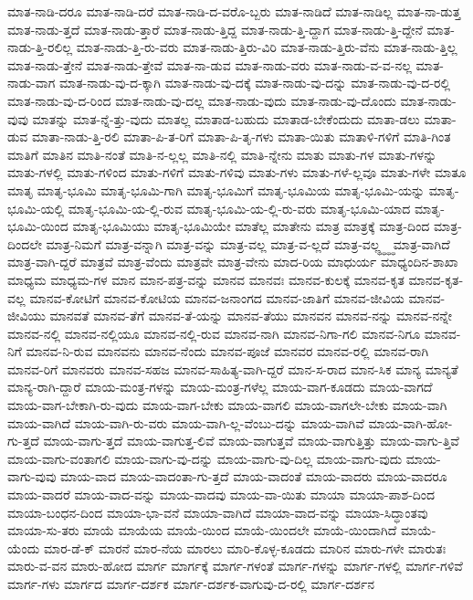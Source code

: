 {ಮಾತ-ನಾಡಿ-ದರೂ
ಮಾತ-ನಾಡಿ-ದರೆ
ಮಾತ-ನಾಡಿ-ದ-ವರೊ-ಬ್ಬರು
ಮಾತ-ನಾಡಿದೆ
ಮಾತ-ನಾಡಿಲ್ಲ
ಮಾತ-ನಾ-ಡುತ್ತ
ಮಾತ-ನಾಡು-ತ್ತದೆ
ಮಾತ-ನಾಡು-ತ್ತಾರೆ
ಮಾತ-ನಾಡು-ತ್ತಿದ್ದ
ಮಾತ-ನಾಡು-ತ್ತಿ-ದ್ದಾಗ
ಮಾತ-ನಾಡು-ತ್ತಿ-ದ್ದೇನೆ
ಮಾತ-ನಾಡು-ತ್ತಿ-ರಲಿಲ್ಲ
ಮಾತ-ನಾಡು-ತ್ತಿ-ರು-ವರು
ಮಾತ-ನಾಡು-ತ್ತಿರು-ವಿರಿ
ಮಾತ-ನಾಡು-ತ್ತಿರು-ವೆನು
ಮಾತ-ನಾಡು-ತ್ತಿಲ್ಲ
ಮಾತ-ನಾಡು-ತ್ತೇನೆ
ಮಾತ-ನಾಡು-ತ್ತೇವೆ
ಮಾತ-ನಾ-ಡುವ
ಮಾತ-ನಾಡು-ವರು
ಮಾತ-ನಾಡು-ವ-ವ-ನಲ್ಲ
ಮಾತ-ನಾಡು-ವಾಗ
ಮಾತ-ನಾಡು-ವು-ದ-ಕ್ಕಾಗಿ
ಮಾತ-ನಾಡು-ವು-ದಕ್ಕೆ
ಮಾತ-ನಾಡು-ವು-ದನ್ನು
ಮಾತ-ನಾಡು-ವು-ದ-ರಲ್ಲಿ
ಮಾತ-ನಾಡು-ವು-ದ-ರಿಂದ
ಮಾತ-ನಾಡು-ವು-ದಲ್ಲ
ಮಾತ-ನಾಡು-ವುದು
ಮಾತ-ನಾಡು-ವು-ದೊಂದು
ಮಾತ-ನಾಡು-ವುವು
ಮಾತನ್ನು
ಮಾತ-ನ್ನೆ-ತ್ತು-ವುದು
ಮಾತಲ್ಲ
ಮಾತಾಡ-ಬಹುದು
ಮಾತಾಡ-ಬೇಕೆಂದುದು
ಮಾತಾ-ಡಲು
ಮಾತಾ-ಡುವ
ಮಾತಾ-ನಾಡು-ತ್ತಿ-ರಲಿ
ಮಾತಾ-ಪಿ-ತ-ರಿಗೆ
ಮಾತಾ-ಪಿ-ತೃ-ಗಳು
ಮಾತಾ-ಯಿತು
ಮಾತಾಳಿ-ಗಳಿಗೆ
ಮಾತಿ-ಗಿಂತ
ಮಾತಿಗೆ
ಮಾತಿನ
ಮಾತಿ-ನಂತೆ
ಮಾತಿ-ನ-ಲ್ಲಲ್ಲ
ಮಾತಿ-ನಲ್ಲಿ
ಮಾತಿ-ನ್ನೇನು
ಮಾತು
ಮಾತು-ಗಳ
ಮಾತು-ಗಳನ್ನು
ಮಾತು-ಗಳಲ್ಲಿ
ಮಾತು-ಗಳಿಂದ
ಮಾತು-ಗಳಿಗೆ
ಮಾತು-ಗಳಿವು
ಮಾತು-ಗಳು
ಮಾತು-ಗಳೆ-ಲ್ಲವೂ
ಮಾತು-ಗಳೇ
ಮಾತೂ
ಮಾತೃ
ಮಾತೃ-ಭೂಮಿ
ಮಾತೃ-ಭೂಮಿ-ಗಾಗಿ
ಮಾತೃ-ಭೂಮಿಗೆ
ಮಾತೃ-ಭೂಮಿಯ
ಮಾತೃ-ಭೂಮಿ-ಯನ್ನು
ಮಾತೃ-ಭೂಮಿ-ಯಲ್ಲಿ
ಮಾತೃ-ಭೂಮಿ-ಯ-ಲ್ಲಿ-ರುವ
ಮಾತೃ-ಭೂಮಿ-ಯ-ಲ್ಲಿ-ರು-ವರು
ಮಾತೃ-ಭೂಮಿ-ಯಾದ
ಮಾತೃ-ಭೂಮಿ-ಯಿಂದ
ಮಾತೃ-ಭೂಮಿಯು
ಮಾತೃ-ಭೂಮಿಯೇ
ಮಾತೆಲ್ಲ
ಮಾತೇನು
ಮಾತ್ರ
ಮಾತ್ರಕ್ಕೆ
ಮಾತ್ರ-ದಿಂದ
ಮಾತ್ರ-ದಿಂದಲೇ
ಮಾತ್ರ-ನಿಮಗೆ
ಮಾತ್ರ-ವನ್ನಾಗಿ
ಮಾತ್ರ-ವನ್ನು
ಮಾತ್ರ-ವಲ್ಲ
ಮಾತ್ರ-ವ-ಲ್ಲದೆ
ಮಾತ್ರ-ವಲ್ಲ್ಧ್ಧ್ಧ್ಧ
ಮಾತ್ರ-ವಾಗಿದೆ
ಮಾತ್ರ-ವಾಗಿ-ದ್ದರೆ
ಮಾತ್ರವೆ
ಮಾತ್ರ-ವೆಂದು
ಮಾತ್ರವೇ
ಮಾತ್ರ-ವೇನು
ಮಾದ-ರಿಯ
ಮಾಧುರ್ಯ
ಮಾಧ್ಯಂದಿನ-ಶಾಖಾ
ಮಾಧ್ಯಮ
ಮಾಧ್ಯಮ-ಗಳ
ಮಾನ
ಮಾನ-ಪತ್ರ-ವನ್ನು
ಮಾನವ
ಮಾನವಃ
ಮಾನವ-ಕುಲಕ್ಕೆ
ಮಾನವ-ಕೃತ
ಮಾನವ-ಕೃತ-ವಲ್ಲ
ಮಾನವ-ಕೋಟಿಗೆ
ಮಾನವ-ಕೋಟಿಯ
ಮಾನವ-ಜನಾಂಗದ
ಮಾನವ-ಜಾತಿಗೆ
ಮಾನವ-ಜೀವಿಯ
ಮಾನವ-ಜೀವಿಯು
ಮಾನವತೆ
ಮಾನವ-ತೆಗೆ
ಮಾನವ-ತೆ-ಯನ್ನು
ಮಾನವ-ತೆಯು
ಮಾನವನ
ಮಾನವ-ನನ್ನು
ಮಾನವ-ನನ್ನೇ
ಮಾನವ-ನಲ್ಲಿ
ಮಾನವ-ನಲ್ಲಿಯೂ
ಮಾನವ-ನಲ್ಲಿ-ರುವ
ಮಾನವ-ನಾಗಿ
ಮಾನವ-ನಿಗಾ-ಗಲಿ
ಮಾನವ-ನಿಗೂ
ಮಾನವ-ನಿಗೆ
ಮಾನವ-ನಿ-ರುವ
ಮಾನವನು
ಮಾನವ-ನೆಂದು
ಮಾನವ-ಪೂಜೆ
ಮಾನವರ
ಮಾನವ-ರಲ್ಲಿ
ಮಾನವ-ರಾಗಿ
ಮಾನವ-ರಿಗೆ
ಮಾನವರು
ಮಾನವ-ಸಹಜ
ಮಾನವ-ಸಾಹಿತ್ಯ-ವಾಗಿ-ದ್ದರೆ
ಮಾನ-ಸ-ರಾದ
ಮಾನ-ಸಿಕ
ಮಾನ್ಯ
ಮಾನ್ಯತೆ
ಮಾನ್ಯ-ರಾಗಿ-ದ್ದಾರೆ
ಮಾಯ-ಮಂತ್ರ-ಗಳನ್ನು
ಮಾಯ-ಮಂತ್ರ-ಗಳೆಲ್ಲ
ಮಾಯ-ವಾಗ-ಕೂಡದು
ಮಾಯ-ವಾಗದೆ
ಮಾಯ-ವಾಗ-ಬೇಕಾಗಿ-ರು-ವುದು
ಮಾಯ-ವಾಗ-ಬೇಕು
ಮಾಯ-ವಾಗಲಿ
ಮಾಯ-ವಾಗಲೇ-ಬೇಕು
ಮಾಯ-ವಾಗಿ
ಮಾಯ-ವಾಗಿದೆ
ಮಾಯ-ವಾಗಿ-ರು-ವರು
ಮಾಯ-ವಾಗಿ-ಲ್ಲ-ವೆಂಬು-ದನ್ನು
ಮಾಯ-ವಾಗಿವೆ
ಮಾಯ-ವಾಗಿ-ಹೋ-ಗು-ತ್ತದೆ
ಮಾಯ-ವಾಗು-ತ್ತದೆ
ಮಾಯ-ವಾಗುತ್ತ-ಲಿವೆ
ಮಾಯ-ವಾಗುತ್ತವೆ
ಮಾಯ-ವಾಗುತ್ತಿತ್ತು
ಮಾಯ-ವಾಗು-ತ್ತಿವೆ
ಮಾಯ-ವಾಗು-ವಂತಾಗಲಿ
ಮಾಯ-ವಾಗು-ವು-ದನ್ನು
ಮಾಯ-ವಾಗು-ವು-ದಿಲ್ಲ
ಮಾಯ-ವಾಗು-ವುದು
ಮಾಯ-ವಾಗು-ವುವು
ಮಾಯ-ವಾದ
ಮಾಯ-ವಾದಂತಾ-ಗು-ತ್ತದೆ
ಮಾಯ-ವಾದಂತೆ
ಮಾಯ-ವಾದರು
ಮಾಯ-ವಾದರೂ
ಮಾಯ-ವಾದರೆ
ಮಾಯ-ವಾದ-ವನ್ನು
ಮಾಯ-ವಾದವು
ಮಾಯ-ವಾ-ಯಿತು
ಮಾಯಾ
ಮಾಯಾ-ಪಾಶ-ದಿಂದ
ಮಾಯಾ-ಬಂಧನ-ದಿಂದ
ಮಾಯಾ-ಭಾ-ವನೆ
ಮಾಯಾ-ವಾಗಿದೆ
ಮಾಯಾ-ವಾದ-ವನ್ನು
ಮಾಯಾ-ಸಿದ್ಧಾಂತವು
ಮಾಯಾ-ಸು-ತರು
ಮಾಯೆ
ಮಾಯೆಯ
ಮಾಯೆ-ಯಿಂದ
ಮಾಯೆ-ಯಿಂದಲೇ
ಮಾಯೆ-ಯಿಂದಾಗಿದೆ
ಮಾಯೆ-ಯೆಂದು
ಮಾರ-ಡೆ-ಕ್
ಮಾರನೆ
ಮಾರ-ನೆಯ
ಮಾರಲು
ಮಾರಿ-ಕೊಳ್ಳ-ಕೂಡದು
ಮಾರಿನ
ಮಾರು-ಗಳೇ
ಮಾರುತಃ
ಮಾರು-ವ-ವನ
ಮಾರು-ಹೋದ
ಮಾರ್ಗ
ಮಾರ್ಗಕ್ಕೆ
ಮಾರ್ಗ-ಗಳಂತೆ
ಮಾರ್ಗ-ಗಳನ್ನು
ಮಾರ್ಗ-ಗಳಲ್ಲಿ
ಮಾರ್ಗ-ಗಳಿವೆ
ಮಾರ್ಗ-ಗಳು
ಮಾರ್ಗದ
ಮಾರ್ಗ-ದರ್ಶಕ
ಮಾರ್ಗ-ದರ್ಶಕ-ವಾಗುವು-ದ-ರಲ್ಲಿ
ಮಾರ್ಗ-ದರ್ಶನ
}
